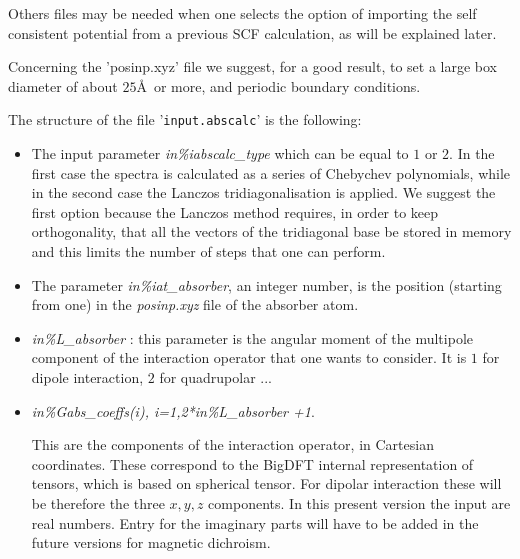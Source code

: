 \documentclass[a4paper,11pt]{report}
\begin{document}
Others files may be needed when one selects the option of importing
the self consistent potential from a previous SCF calculation, as will
be explained later. 

Concerning the '{posinp.xyz}' file we suggest, for a good result,
to set a large box diameter of about $25$\AA\ or more, and periodic
boundary conditions.

The structure of the file '{\texttt{input.abscalc}}' is the following:

\begin{itemize}
\item The input parameter {\it in\%iabscalc\_type} which can be equal to  $1$
or $2$. In the first case the spectra is calculated as a series of
Chebychev polynomials, while in the second case the Lanczos
tridiagonalisation is applied. We suggest the first option
because the Lanczos method requires, in order to keep orthogonality,
 that all the vectors of the tridiagonal base be stored in memory
and this limits the number of steps that one can perform.

\item The  parameter {\it in\%iat\_absorber}, an integer number,
is the position (starting from one) in  the {\it posinp.xyz} file
of the absorber atom.

\item  {\it in\%L\_absorber} : this parameter is the angular moment
of the multipole component of the interaction operator that 
one wants to consider. It is $1$ for dipole interaction, $2$ for
quadrupolar ...

\item {\it in\%Gabs\_coeffs(i), i=1,2*in\%L\_absorber +1}.

This are the components of the interaction operator, in Cartesian
coordinates. These correspond to the BigDFT internal representation 
of tensors, which is based on spherical tensor. 
For dipolar interaction these will be therefore the three $x,y,z$
components. In this present version the input are real numbers.
Entry for the imaginary parts will have to be added in the future versions 
for magnetic dichroism.


\end{itemize}
\end{document}
